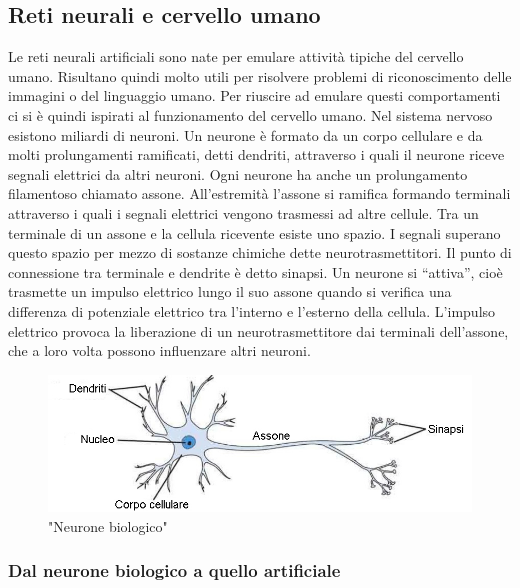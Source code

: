 \documentclass[a4paper,11pt]{article}
\begin{document}
    \subsection {Reti neurali e cervello umano}
    Le reti neurali artificiali sono nate per emulare attività tipiche del
    cervello umano. Risultano quindi molto utili per risolvere problemi di riconoscimento delle immagini o del linguaggio umano.
    Per riuscire ad emulare questi comportamenti ci si è quindi ispirati al funzionamento del cervello umano.
    Nel sistema nervoso esistono miliardi di neuroni. Un
    neurone è formato da un corpo cellulare e da molti prolungamenti
    ramificati, detti dendriti, attraverso i quali il neurone riceve segnali
    elettrici da altri neuroni. Ogni neurone ha anche un prolungamento
    filamentoso chiamato assone. All’estremità l’assone si ramifica formando terminali
    attraverso i quali i segnali elettrici vengono trasmessi ad altre cellule.
    Tra un terminale di un assone e la cellula ricevente esiste uno spazio. I segnali superano questo spazio per
    mezzo di sostanze chimiche dette neurotrasmettitori. Il punto di
    connessione tra terminale e dendrite è detto sinapsi. 
    Un neurone si “attiva”, cioè trasmette un impulso elettrico lungo il suo
    assone quando si verifica una differenza di potenziale elettrico tra l’interno
    e l’esterno della cellula. L’impulso elettrico provoca la liberazione di un
    neurotrasmettitore dai terminali dell’assone, che a loro volta possono influenzare altri neuroni. 
        
    \begin{figure}[h]
        \centering
        \includegraphics[scale=0.7]{cervello.jpg}
        \caption{"Neurone biologico"}
    \end{figure}

    \subsubsection{Dal neurone biologico a quello artificiale}
    
\end{document}
